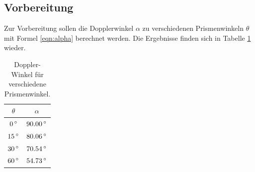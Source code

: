 \subsection{Vorbereitung}
Zur Vorbereitung sollen die Dopplerwinkel $\alpha$ zu verschiedenen Prismenwinkeln
$\theta$
mit Formel \eqref{eqn:alpha} berechnet werden. Die Ergebnisse finden sich in
Tabelle \ref{tab:alpha} wieder.
\begin{table}
  \centering
  \begin{tabular}{c|c}
    \toprule
    $\theta$ & $\alpha$ \\
    \midrule
    $ 0\,\si{\degree}$ & $90.00\,\si{\degree}$ \\
    $15\,\si{\degree}$ & $80.06\,\si{\degree}$ \\
    $30\,\si{\degree}$ & $70.54\,\si{\degree}$ \\
    $60\,\si{\degree}$ & $54.73\,\si{\degree}$ \\
    \bottomrule
  \end{tabular}
  \caption{Doppler-Winkel für verschiedene Prismenwinkel.}
  \label{tab:alpha}
\end{table}
